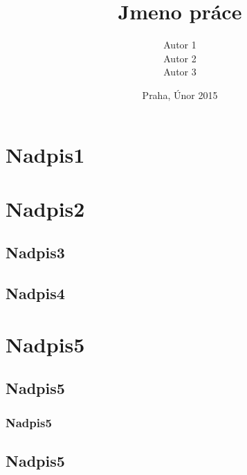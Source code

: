 \documentclass{kttsem}
\title{Jmeno práce}
\author{Autor 1 \\ Autor 2 \\ Autor 3}
\date{Praha, Únor 2015}
\begin{document}
\maketitle
\tableofcontents
\newpage


\section{Nadpis1}
\lipsum
\section{Nadpis2}
\lipsum
\subsection{Nadpis3}
\lipsum
\subsection{Nadpis4}
\lipsum
\section{Nadpis5}
\subsection{Nadpis5}
\subsubsection{Nadpis5}
\subsection{Nadpis5}
\end{document}
